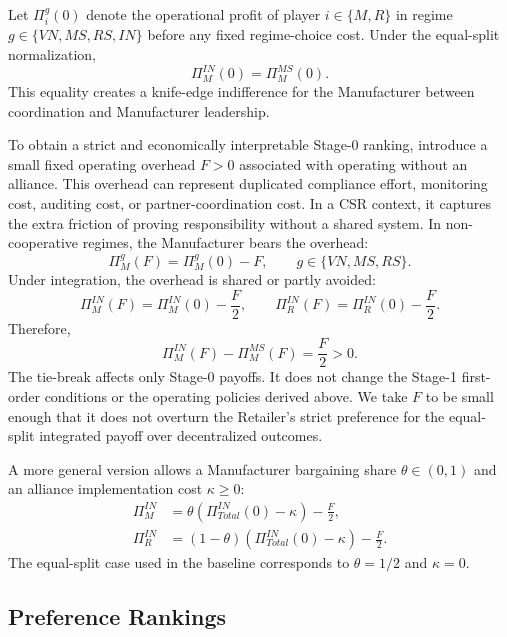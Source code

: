 Let $\Pi_i^g(0)$ denote the operational profit of player $i\in\{M,R\}$ in regime $g\in\{VN,MS,RS,IN\}$ before any fixed regime-choice cost. Under the equal-split normalization,
\begin{equation*}
    \Pi_M^{IN}(0)=\Pi_M^{MS}(0).
\end{equation*}
This equality creates a knife-edge indifference for the Manufacturer between coordination and Manufacturer leadership.

To obtain a strict and economically interpretable Stage-0 ranking, introduce a small fixed operating overhead $F>0$ associated with operating without an alliance. This overhead can represent duplicated compliance effort, monitoring cost, auditing cost, or partner-coordination cost. In a CSR context, it captures the extra friction of proving responsibility without a shared system. In non-cooperative regimes, the Manufacturer bears the overhead:
\begin{equation*}
    \Pi_M^g(F)=\Pi_M^g(0)-F,
    \qquad g\in\{VN,MS,RS\}.
\end{equation*}
Under integration, the overhead is shared or partly avoided:
\begin{equation*}
    \Pi_M^{IN}(F)=\Pi_M^{IN}(0)-\frac{F}{2},
    \qquad
    \Pi_R^{IN}(F)=\Pi_R^{IN}(0)-\frac{F}{2}.
\end{equation*}
Therefore,
\begin{equation*}
    \Pi_M^{IN}(F)-\Pi_M^{MS}(F)=\frac{F}{2}>0.
\end{equation*}
The tie-break affects only Stage-0 payoffs. It does not change the Stage-1 first-order conditions or the operating policies derived above. We take $F$ to be small enough that it does not overturn the Retailer's strict preference for the equal-split integrated payoff over decentralized outcomes.

A more general version allows a Manufacturer bargaining share $\theta\in(0,1)$ and an alliance implementation cost $\kappa\geq 0$:
\begin{align*}
    \Pi_M^{IN} &= \theta\left(\Pi_{Total}^{IN}(0)-\kappa\right)-\frac{F}{2},\\
    \Pi_R^{IN} &= (1-\theta)\left(\Pi_{Total}^{IN}(0)-\kappa\right)-\frac{F}{2}.
\end{align*}
The equal-split case used in the baseline corresponds to $\theta=1/2$ and $\kappa=0$.

\subsection{Preference Rankings}


